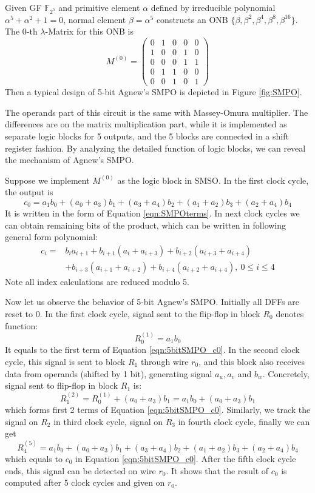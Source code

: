 \begin{Example}
Given GF $\mathbb F_{2^5}$ and primitive element $\alpha$ defined by irreducible polynomial 
$\alpha^5+\alpha^2+1=0$, normal element $\beta = \alpha^5$ constructs an ONB $\{\beta,\beta^2,\beta^4,\beta^8,\beta^{16}\}$.
The $0$-th $\lambda$-Matrix for this ONB is
\begin{equation*}
M^{(0)} = \left(\begin{array}{lcccr}
0 &1 &0 &0 &0 \\
1 &0 &0 &1 &0 \\
0 &0 &0 &1 &1 \\
0 &1 &1 &0 &0 \\
0 &0 &1 &0 &1
\end{array}\right)
\end{equation*}
Then a typical design of 5-bit Agnew's SMPO is depicted in Figure \ref{fig:SMPO}.

The operands part of this circuit is the same with Massey-Omura multiplier. The differences are on 
the matrix multiplication part, while it is implemented as separate logic blocks for 5 outputs,
and the 5 blocks are connected in a shift register fashion. By analyzing the detailed function of 
logic blocks, we can reveal the mechanism of Agnew's SMPO.

Suppose we implement $M^{(0)}$ as the logic block in SMSO. In the first clock cycle, the output is
\begin{equation}
\label{eqn:5bitSMPO_c0}
c_0 = a_1b_0+(a_0+a_3)b_1 + (a_3+a_4)b_2 + (a_1+a_2)b_3 + (a_2+a_4)b_4
\end{equation}
It is written in the form of Equation \ref{eqn:SMPOterms}. In next clock cycles we can obtain 
remaining bits of the product, which can be written in following general form polynomial:
\begin{align}
c_i =& b_ia_{i+1} + b_{i+1}(a_i + a_{i+3}) + b_{i+2}(a_{i+3} + a_{i+4}) \nonumber\\
&+ b_{i+3}(a_{i+1} + a_{i+2}) + b_{i+4}
(a_{i+2} + a_{i+4}),\ 0\leq i\leq 4 \nonumber
\end{align}
Note all index calculations are reduced modulo 5.

Now let us observe the behavior of 5-bit Agnew's SMPO. Initially all DFFs are reset to 0. 
In the first clock cycle,
signal sent to the flip-flop in block $R_0$ denotes function:
$$R_0^{(1)} = a_1b_0$$
It equals to the first term of Equation \ref{eqn:5bitSMPO_c0}. In the second clock cycle,
this signal is sent to block $R_1$ through wire $r_0$, and this block also receives data 
from operands (shifted by 1 bit), generating signal $a_u,a_v$ and $b_w$. Concretely,
signal sent to flip-flop in block $R_1$ is:
$$R_1^{(2)} = R_0^{(1)} + (a_0+a_3)b_1 = a_1b_0+(a_0+a_3)b_1$$
which forms first 2 terms of Equation \ref{eqn:5bitSMPO_c0}. Similarly, we track the signal 
on $R_2$ in third clock cycle, signal on $R_3$ in fourth clock cycle, finally we can get 
$$R_4^{(5)} = a_1b_0+(a_0+a_3)b_1 + (a_3+a_4)b_2 + (a_1+a_2)b_3 + (a_2+a_4)b_4$$
which equals to $c_0$ in Equation \ref{eqn:5bitSMPO_c0}.
After the fifth clock cycle ends, this signal can be detected on wire $r_0$. It shows that 
the result of $c_0$ is computed after 5 clock cycles and given on $r_0$.


\end{Example}
